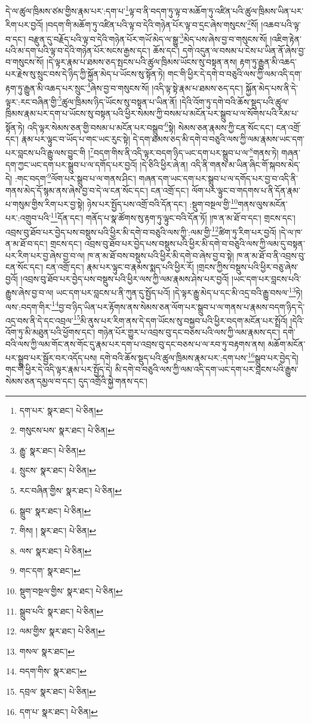དེ་ལ་ཚུལ་ཁྲིམས་ཙམ་གྱིས་རྣམ་པར་:དག་པ་\footnote{དག་པར་  སྣར་ཐང་།  པེ་ཅིན། }ལྟ་བ་ནི་བདག་ཏུ་ལྟ་བ་མཆོག་ཏུ་འཛིན་པའི་ཚུལ་ཁྲིམས་ཡིན་པར་རིག་པར་བྱའོ། །བདག་གི་མཆོག་ཏུ་འཛིན་པའི་ལྟ་བ་དེའི་གཉེན་པོར་ལྟ་བ་དྲང་ཞེས་གསུངས་\footnote{གསུངས་པས་  སྣར་ཐང་།  པེ་ཅིན། }སོ། །འཆབ་པའི་ལྟ་བ་དང་། བརྫུན་དུ་བརྗོད་པའི་ལྟ་བ་དེའི་གཉེན་པོར་གཡོ་མེད་ལ་སྒྱུ་\footnote{རྒྱུ་  སྣར་ཐང་།  པེ་ཅིན། }མེད་པས་ཞེས་བྱ་བ་གསུངས་སོ། །འཇིག་རྟེན་པའི་མ་དག་པའི་ལྟ་བ་དེའི་གཉེན་པོར་སངས་རྒྱས་དང་། ཆོས་དང་། དགེ་འདུན་ལ་བསམ་པ་ངེས་པ་ཡིན་ནོ་ཞེས་བྱ་བ་གསུངས་སོ། །དེ་ལྟར་རྣམ་པ་ཐམས་ཅད་སྤངས་པའི་ཚུལ་ཁྲིམས་ཡོངས་སུ་བསྟན་ནས། རྟག་ཏུ་རྒྱུན་མི་འཆད་པར་རྗེས་སུ་སྲུང་བས་དེ་ཉིད་ཀྱི་སྐྱོན་མེད་པ་ཡོངས་སུ་སྟོན་ཏེ། གང་གི་ཕྱིར་དེ་དགེ་བ་བཅུའི་ལས་ཀྱི་ལམ་འདི་དག་རྟག་ཏུ་རྒྱུན་མི་འཆད་པར་སྲུང་\footnote{སྲུངས་  སྣར་ཐང་།  པེ་ཅིན། }ཞེས་བྱ་བ་གསུངས་སོ། །འདི་ལྟ་སྟེ་རྣམ་པ་ཐམས་ཅད་དང་། སྐྱོན་མེད་པས་ནི་དེ་ལྟར་:རང་བཞིན་གྱི་\footnote{རང་བཞིན་གྱིས་  སྣར་ཐང་།  པེ་ཅིན། }ཚུལ་ཁྲིམས་ཉིད་ཡོངས་སུ་བསྟན་པ་ཡིན་ནོ། །དེའི་འོག་ཏུ་དགེ་བའི་ཆོས་སྡུད་པའི་ཚུལ་ཁྲིམས་རྣམ་པར་དག་པ་ཡོངས་སུ་བསྟན་པའི་ཕྱིར་སེམས་ཀྱི་བསམ་པ་མངོན་པར་སྒྲུབ་པ་ལ་སོགས་པའི་རིམ་པ་སྟོན་ཏེ། འདི་ལྟར་སེམས་ཅན་གྱི་བསམ་པ་མངོན་པར་བསྒྲུབ་\footnote{སྒྲུབ་  སྣར་ཐང་།  པེ་ཅིན། }སྟེ། སེམས་ཅན་རྣམས་ཀྱི་ངན་སོང་དང་། ངན་འགྲོ་དང་། རྣམ་པར་ལྟུང་བ་ཡོད་པ་གང་ཡང་རུང་སྟེ། དེ་དག་ཐམས་ཅད་མི་དགེ་བ་བཅུའི་ལས་ཀྱི་ལམ་རྣམས་ཡང་དག་པར་བླངས་པའི་རྒྱུ་ལས་བྱུང་གི །\footnote{གིས། །  སྣར་ཐང་།  པེ་ཅིན། }བདག་གིས་ནི་འདི་ལྟར་བདག་ཉིད་ཡང་དག་པར་སྒྲུབ་པ་ལ་\footnote{ལས་  སྣར་ཐང་།  པེ་ཅིན། }གནས་ཏེ། གཞན་དག་ཀྱང་ཡང་དག་པར་སྒྲུབ་པ་ལ་དགོད་པར་བྱའོ། །དེ་ཅིའི་ཕྱིར་ཞེ་ན། འདི་ནི་གནས་མ་ཡིན་ཞིང་གོ་སྐབས་མེད་དེ། :གང་བདག་\footnote{གང་དག་  སྣར་ཐང་། }ལོག་པར་སྒྲུབ་པ་ལ་གནས་ཤིང་། གཞན་དག་ཡང་དག་པར་སྒྲུབ་པ་ལ་དགོད་པར་བྱ་བ་འདི་ནི་གནས་མེད་དོ་སྙམ་ནས་ཞེས་བྱ་བ་དེ་ལ་ངན་སོང་དང་། ངན་འགྲོ་དང་། ལོག་པར་ལྟུང་བ་གདགས་པ་ནི་དོན་རྣམ་པ་གསུམ་གྱིས་རིག་པར་བྱ་སྟེ། ཉེས་པར་སྤྱོད་པས་འགྲོ་བའི་དོན་དང་། :སྡུག་བསྔལ་གྱི་\footnote{སྡུག་བསྔལ་གྱིས་  སྣར་ཐང་།  པེ་ཅིན། }གནས་ལུས་མངོན་པར་:འགྲུབ་པའི་\footnote{སྒྲུབ་པའི་  སྣར་ཐང་།  པེ་ཅིན། }དོན་དང་། གནོད་པ་སྣ་ཚོགས་སུ་རྟག་ཏུ་ལྟུང་བའི་དོན་ཏོ། །ཁ་ན་མ་ཐོ་བ་དང་། གྲངས་དང་། འབྲས་བུ་ཐོབ་པར་བྱེད་པས་བསྡུས་པའི་ཕྱིར་མི་དགེ་བ་བཅུའི་ལས་ཀྱི་:ལམ་གྱི་\footnote{ལམ་གྱིས་  སྣར་ཐང་།  པེ་ཅིན། }ཚིག་ཏུ་རིག་པར་བྱའོ། །དེ་ལ་ཁ་ན་མ་ཐོ་བ་དང་། གྲངས་དང་། འབྲས་བུ་ཐོབ་པར་བྱེད་པས་བསྡུས་པའི་ཕྱིར་མི་དགེ་བ་བཅུའི་ལས་ཀྱི་ལམ་དུ་བསྟན་པར་རིག་པར་བྱ་ཞེས་བྱ་བ་ལ། ཁ་ན་མ་ཐོ་བས་བསྡུས་པའི་ཕྱིར་མི་དགེ་བ་ཞེས་བྱ་བ་སྟེ། ཁ་ན་མ་ཐོ་བ་ནི་འབྲས་བུ་ངན་སོང་དང་། ངན་འགྲོ་དང་། རྣམ་པར་ལྟུང་བ་རྣམས་སྨད་པའི་ཕྱིར་རོ། །གྲངས་ཀྱིས་བསྡུས་པའི་ཕྱིར་བཅུ་ཞེས་བྱའོ། །འབྲས་བུ་ཐོབ་པར་བྱེད་པས་བསྡུས་པའི་ཕྱིར་ལས་ཀྱི་ལམ་རྣམས་ཤེས་པར་བྱའོ། །ཡང་དག་པར་བླངས་པའི་རྒྱུས་ཞེས་བྱ་བ་ལ། ཡང་དག་པར་བླངས་པ་ནི་ཀུན་དུ་སྤྱོད་པའོ། །དེ་ལྟར་རྒྱུ་མེད་པ་དང་མི་འདྲ་བའི་རྒྱུ་བསལ་\footnote{གསལ་  སྣར་ཐང་། }ཏེ། ལས་:བདག་གིར་\footnote{བདག་གིས་  སྣར་ཐང་། }བྱ་བ་ཉིད་ཡིན་པར་རྟོགས་ནས་སེམས་ཅན་ལོག་པར་སྒྲུབ་པ་ལ་གནས་པ་རྣམས་བདག་ཉིད་དེ་འདྲ་བས་ནི་དེ་དང་འབྲལ་\footnote{དབྲལ་  སྣར་ཐང་།  པེ་ཅིན། }མི་ནུས་པར་རིག་ནས་དེ་དག་ཡོངས་སུ་བསྐྱབ་པའི་ཕྱིར་བདག་མངོན་པར་སྤྲོའོ། །དེའི་འོག་ཏུ་མི་མཐུན་པའི་ཕྱོགས་དང་། གཉེན་པོར་གྱུར་པ་འབྲས་བུ་དང་བཅས་པའི་ལས་ཀྱི་ལམ་རྣམས་དང་། དགེ་བའི་ལས་ཀྱི་ལམ་གོང་ནས་གོང་དུ་རྣམ་པར་དག་པ་འབྲས་བུ་དང་བཅས་པ་ལ་རབ་ཏུ་བརྟགས་ནས། མཆོག་མངོན་པར་སྒྲུབ་པར་སྦྱོར་བར་འདོད་པས། དགེ་བའི་ཆོས་སྡུད་པའི་ཚུལ་ཁྲིམས་རྣམ་པར་:དག་པས་\footnote{དག་པ་  སྣར་ཐང་།  པེ་ཅིན། }སྒྲུབ་པར་བྱེད་དེ། གང་གི་ཕྱིར་དེ་འདི་ལྟར་རྣམ་པར་སྤྱོད་དེ། མི་དགེ་བ་བཅུའི་ལས་ཀྱི་ལམ་འདི་དག་ཡང་དག་པར་བླངས་པའི་རྒྱུས་སེམས་ཅན་དམྱལ་བ་དང་། དུད་འགྲོའི་སྐྱེ་གནས་དང་། 